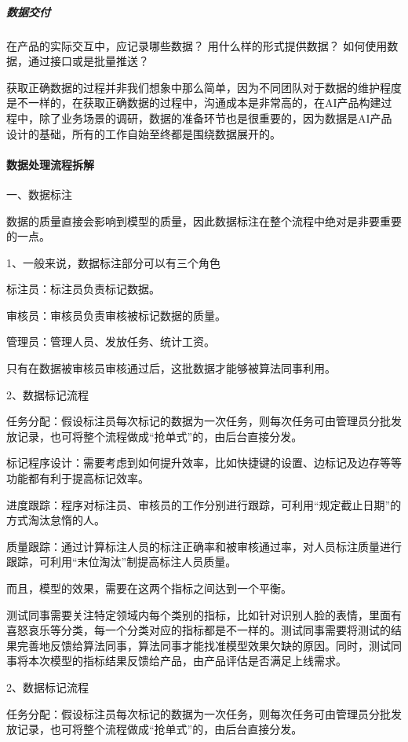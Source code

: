 \documentclass[letterpaper,11pt,english]{sphinxmanual}
\begin{document}
\subparagraph{数据交付}
\label{\detokenize{chapter_project/Data Process:id5}}\label{\detokenize{chapter_project/Data Process:id6}}
在产品的实际交互中，应记录哪些数据？ 用什么样的形式提供数据？
如何使用数据，通过接口或是批量推送？

获取正确数据的过程并非我们想象中那么简单，因为不同团队对于数据的维护程度是不一样的，在获取正确数据的过程中，沟通成本是非常高的，在AI产品构建过程中，除了业务场景的调研，数据的准备环节也是很重要的，因为数据是AI产品设计的基础，所有的工作自始至终都是围绕数据展开的。


\paragraph{数据处理流程拆解}
\label{\detokenize{chapter_project/Data Process:id7}}
一、数据标注

数据的质量直接会影响到模型的质量，因此数据标注在整个流程中绝对是非要重要的一点。

1、一般来说，数据标注部分可以有三个角色

标注员：标注员负责标记数据。

审核员：审核员负责审核被标记数据的质量。

管理员：管理人员、发放任务、统计工资。

只有在数据被审核员审核通过后，这批数据才能够被算法同事利用。

2、数据标记流程

任务分配：假设标注员每次标记的数据为一次任务，则每次任务可由管理员分批发放记录，也可将整个流程做成“抢单式”的，由后台直接分发。

标记程序设计：需要考虑到如何提升效率，比如快捷键的设置、边标记及边存等等功能都有利于提高标记效率。

进度跟踪：程序对标注员、审核员的工作分别进行跟踪，可利用“规定截止日期”的方式淘汰怠惰的人。

质量跟踪：通过计算标注人员的标注正确率和被审核通过率，对人员标注质量进行跟踪，可利用“末位淘汰”制提高标注人员质量。

而且，模型的效果，需要在这两个指标之间达到一个平衡。

测试同事需要关注特定领域内每个类别的指标，比如针对识别人脸的表情，里面有喜怒哀乐等分类，每一个分类对应的指标都是不一样的。测试同事需要将测试的结果完善地反馈给算法同事，算法同事才能找准模型效果欠缺的原因。同时，测试同事将本次模型的指标结果反馈给产品，由产品评估是否满足上线需求。

2、数据标记流程

任务分配：假设标注员每次标记的数据为一次任务，则每次任务可由管理员分批发放记录，也可将整个流程做成“抢单式”的，由后台直接分发。
\end{document}

